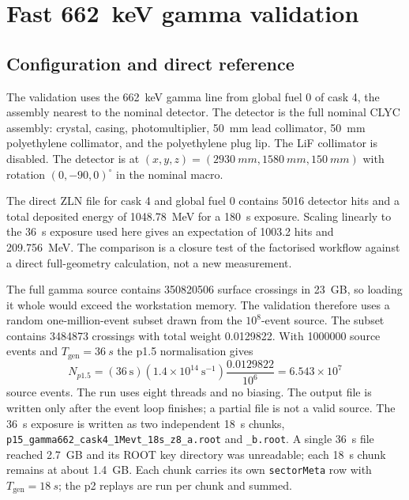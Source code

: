 \documentclass[11pt,a4paper]{article}
\begin{document}
\section{Fast \SI{662}{keV} gamma validation}
\label{sec:gamma-validation}

\subsection{Configuration and direct reference}

The validation uses the \SI{662}{keV} gamma line from global fuel 0 of cask 4,
the assembly nearest to the nominal detector. The detector is the full nominal
CLYC assembly: crystal, casing, photomultiplier, \SI{50}{mm} lead collimator,
\SI{50}{mm} polyethylene collimator, and the polyethylene plug lip. The LiF
collimator is disabled. The detector is at
$(x,y,z)=(\SI{2930}{mm},\SI{1580}{mm},\SI{150}{mm})$ with rotation
$(0,-90,0)^\circ$ in the nominal macro.

The direct ZLN file for cask 4 and global fuel 0 contains 5016 detector hits and
a total deposited energy of \SI{1048.78}{MeV} for a \SI{180}{s} exposure.
Scaling linearly to the \SI{36}{s} exposure used here gives an expectation of
1003.2 hits and \SI{209.756}{MeV}. The comparison is a closure test of the
factorised workflow against a direct full-geometry calculation, not a new
measurement.

The full gamma source contains \num{350820506} surface crossings in
\SI{23}{GB}, so loading it whole would exceed the workstation memory. The
validation therefore uses a random one-million-event subset drawn from the
$10^8$-event source. The subset contains \num{3484873} crossings with total
weight \num{0.0129822}. With \num{1000000} source events and
$T_{\mathrm{gen}}=\SI{36}{s}$ the p1.5 normalisation gives
\begin{equation}
  N_{p1.5} =
  (36~\mathrm{s})(1.4\times10^{14}~\mathrm{s^{-1}})
  \frac{0.0129822}{10^6}
  = 6.543\times10^7
\end{equation}
source events. The run uses eight threads and no biasing. The output file is
written only after the event loop finishes; a partial file is not a valid
source. The \SI{36}{s} exposure is written as two independent \SI{18}{s}
chunks, \texttt{p15\_gamma662\_cask4\_1Mevt\_18s\_z8\_a.root} and
\texttt{\_b.root}. A single \SI{36}{s} file reached \SI{2.7}{GB} and its ROOT
key directory was unreadable; each \SI{18}{s} chunk remains at about
\SI{1.4}{GB}. Each chunk carries its own \texttt{sectorMeta} row with
$T_{\mathrm{gen}}=\SI{18}{s}$; the p2 replays are run per chunk and summed.
\end{document}
